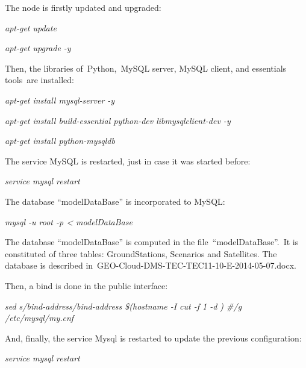 \documentclass[a4paper]{article}
\begin{document}
\bigskip

The node is firstly updated and upgraded:


\bigskip

{\itshape
apt-get update}

{\itshape
apt-get upgrade -y}


\bigskip

Then, the libraries of\ Python,\ MySQL server, MySQL client, and
essentials tools\ are installed:


\bigskip

{\itshape
apt-get install mysql-server -y}

{\itshape
apt-get install build-essential python-dev libmysqlclient-dev -y}

{\itshape
apt-get install python-mysqldb}


\bigskip

The service MySQL is restarted, just in case it was started before:


\bigskip

{\itshape
service mysql restart}


\bigskip

The database {\textquotedblleft}modelDataBase{\textquotedblright} is
incorporated to MySQL:


\bigskip

{\itshape
mysql -u root -p {\textless} modelDataBase}


\bigskip

The database {\textquotedblleft}modelDataBase{\textquotedblright} is
computed in the
file\ {\textquotedblleft}modelDataBase{\textquotedblright}.\ It is
constituted of three tables: GroundStations, Scenarios and Satellites.
The database is described
in\ GEO-Cloud-DMS-TEC-TEC11-10-E-2014-05-07.docx.\ 


\bigskip

Then, a bind is done in the public interface:


\bigskip

{\itshape
sed {\textquotedbl}s/bind-address/bind-address \$(hostname -I {\textbar}
cut -f 1 -d {\textquotesingle} {\textquotesingle}) \#/g{\textquotedbl}
/etc/mysql/my.cnf}


\bigskip

And, finally, the service Mysql is restarted to update the previous
configuration:


\bigskip

{\itshape
service mysql restart}


\bigskip
\end{document}
